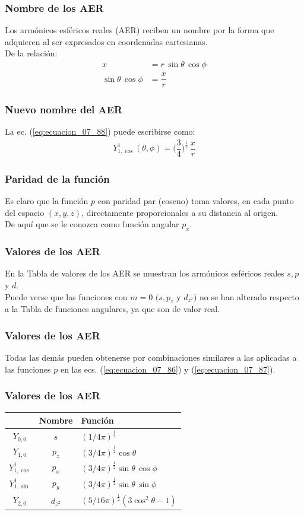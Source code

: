 \documentclass[12pt]{beamer}
\begin{document}
\begin{frame}
\frametitle{Nombre de los AER}
Los armónicos esféricos reales (AER) reciben un nombre por la forma que adquieren al ser expresados en coordenadas cartesianas.
\\
\bigskip
\pause
De la relación:
\begin{align*}
x &= r \, \sin \theta \, \cos \phi \\[0.5em]
\sin \theta \, \cos \phi &= \dfrac{x}{r}
\end{align*}
\end{frame}
\begin{frame}
\frametitle{Nuevo nombre del AER}
La ec. (\ref{eq:ecuacion_07_88}) puede escribirse como:
\pause
\begin{align*}
Y_{1, \cos}^{1} (\theta, \phi) = \bigg( \dfrac{3}{4} \bigg)^{\frac{1}{2}} \, \dfrac{x}{r}
\end{align*}
\end{frame}    
\begin{frame}
\frametitle{Paridad de la función}
Es claro que la función $p$ con paridad par (coseno) toma valores, en cada punto del espacio $(x, y, z)$, directamente proporcionales a su distancia al origen.
\\
\bigskip
\pause
De aquí que se le conozca como función angular $p_{x}$.
\end{frame}
\begin{frame}
\frametitle{Valores de los AER}
En la Tabla de valores de los AER se muestran los armónicos esféricos reales $s, p$ y $d$. 
\\
\bigskip
\pause
Puede verse que las funciones con $m = 0$ $(s, p_{z}$ y $d_{z^{2}})$ no se han alterado respecto a la Tabla de funciones angulares, ya que son de valor real.
\end{frame}
\begin{frame}
\frametitle{Valores de los AER}
Todas las demás pueden obtenerse por combinaciones similares a las aplicadas a las funciones $p$ en las ecs. (\ref{eq:ecuacion_07_86}) y (\ref{eq:ecuacion_07_87}).
\end{frame}
\begin{frame}
\frametitle{Valores de los AER}
\begin{table}[H]
\centering
\renewcommand{\arraystretch}{1.5}
\begin{tabular}{|c | c | l|} \hline
 & Nombre & Función \\ \hline
$Y_{0,0}$ & $s$ & $(1/4 \pi)^{\frac{1}{2}}$ \\ \hline
$Y_{1,0}$ & $p_{z}$ & $(3/4 \pi)^{\frac{1}{2}} \cos \theta$ \\ \hline
$Y_{1, \cos}^{1}$ & $p_{x}$ & $(3/4 \pi)^{\frac{1}{2}} \sin \theta \, \cos \phi$ \\ \hline
$Y_{1, \sin}^{1}$ & $p_{y}$ & $(3/4 \pi)^{\frac{1}{2}} \sin \theta \, \sin \phi$ \\ \hline
$Y_{2, 0}$ & $d_{z^{2}}$ & $(5/16 \pi)^{\frac{1}{2}} (3 \cos^{2} \theta  - 1)$ \\ \hline
\end{tabular}
\end{table}
\end{frame}
\end{document}
